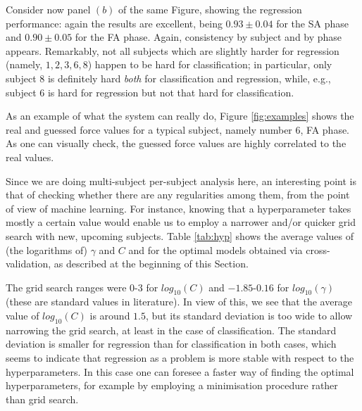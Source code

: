 \documentclass[10pt]{bmc_article}
\newenvironment{bmcformat}{\begin{raggedright}\baselineskip20pt\sloppy\setboolean{publ}{false}}{\end{raggedright}\baselineskip20pt\sloppy}
\begin{document}
\begin{bmcformat}
Consider now panel $(b)$ of the same Figure, showing the regression
performance: again the results are excellent, being $0.93
\pm 0.04$ for the SA phase and $0.90 \pm 0.05$ for the FA
phase. Again, consistency by subject and by phase appears. Remarkably,
not all subjects which are slightly harder for regression (namely,
$1,2,3,6,8$) happen to be hard for classification; in particular, only
subject $8$ is definitely hard \emph{both} for classification and
regression, while, e.g., subject $6$ is hard for regression but not
that hard for classification.

As an example of what the system can really do, Figure
\ref{fig:examples} shows the real and guessed force values for a
typical subject, namely number $6$, FA phase. As one can visually
check, the guessed force values are highly correlated to the real
values.


Since we are doing multi-subject per-subject analysis here, an
interesting point is that of checking whether there are any
regularities among them, from the point of view of machine
learning. For instance, knowing that a hyperparameter takes mostly a
certain value would enable us to employ a narrower and/or quicker grid
search with new, upcoming subjects. Table \ref{tab:hyp} shows the
average values of (the logarithms of) $\gamma$ and $C$ and for the
optimal models obtained via cross-validation, as described at the
beginning of this Section.

The grid search ranges were $0$-$3$ for $log_{10}(C)$ and
$-1.85$-$0.16$ for $log_{10}(\gamma)$ (these are standard values in
literature). In view of this, we see that the average value of
$log_{10}(C)$ is around $1.5$, but its standard deviation is too wide
to allow narrowing the grid search, at least in the case of
classification. The standard deviation is smaller for regression than
for classification in both cases, which seems to indicate that
regression as a problem is more stable with respect to the
hyperparameters. In this case one can foresee a faster way of finding
the optimal hyperparameters, for example by employing a minimisation
procedure rather than grid search.


\end{bmcformat}
\end{document}
